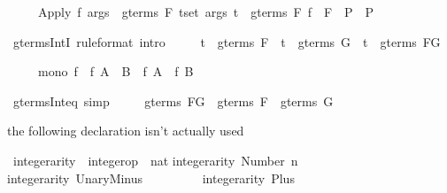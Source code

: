 \begin{isabellebody}
\begin{isamarkuptext}
\begin{isabelle}%
\ \ \ \ \ {\isasymlbrakk}Apply\ f\ args\ {\isasymin}\ gterms\ F{\isacharsemicolon}\ {\isasymlbrakk}{\isasymforall}t{\isasymin}set\ args{\isachardot}\ t\ {\isasymin}\ gterms\ F{\isacharsemicolon}\ f\ {\isasymin}\ F{\isasymrbrakk}\ {\isasymLongrightarrow}\ P{\isasymrbrakk}\ {\isasymLongrightarrow}\ P%
\end{isabelle}
%
\end{isamarkuptext}%
\isamarkuptrue%
\ gterms{\isacharunderscore}IntI\ {\isacharbrackleft}rule{\isacharunderscore}format{\isacharcomma}\ intro{\isacharbang}{\isacharbrackright}{\isacharcolon}\isanewline
\ \ \ \ \ {\isachardoublequote}t\ {\isasymin}\ gterms\ F\ {\isasymLongrightarrow}\ t\ {\isasymin}\ gterms\ G\ {\isasymlongrightarrow}\ t\ {\isasymin}\ gterms\ {\isacharparenleft}F{\isasyminter}G{\isacharparenright}{\isachardoublequote}\isanewline
\isamarkupfalse%
\isamarkupfalse%
\isamarkuptrue%
\isamarkupfalse%
\isamarkupfalse%
%
\begin{isamarkuptext}%
\begin{isabelle}%
\ \ \ \ \ mono\ f\ {\isasymLongrightarrow}\ f\ {\isacharparenleft}A\ {\isasyminter}\ B{\isacharparenright}\ {\isasymsubseteq}\ f\ A\ {\isasyminter}\ f\ B%
\end{isabelle}
%
\end{isamarkuptext}%
\isamarkuptrue%
\ gterms{\isacharunderscore}Int{\isacharunderscore}eq\ {\isacharbrackleft}simp{\isacharbrackright}{\isacharcolon}\isanewline
\ \ \ \ \ {\isachardoublequote}gterms\ {\isacharparenleft}F{\isasyminter}G{\isacharparenright}\ {\isacharequal}\ gterms\ F\ {\isasyminter}\ gterms\ G{\isachardoublequote}\isanewline
\isamarkupfalse%
\isamarkupfalse%
%
\begin{isamarkuptext}%
the following declaration isn't actually used%
\end{isamarkuptext}%
\isamarkuptrue%
\ integer{\isacharunderscore}arity\ {\isacharcolon}{\isacharcolon}\ {\isachardoublequote}integer{\isacharunderscore}op\ {\isasymRightarrow}\ nat{\isachardoublequote}\isanewline
\isamarkupfalse%
\isanewline
{\isachardoublequote}integer{\isacharunderscore}arity\ {\isacharparenleft}Number\ n{\isacharparenright}\ \ \ \ \ \ \ \ {\isacharequal}\ {}{\isachardoublequote}\isanewline
{\isachardoublequote}integer{\isacharunderscore}arity\ UnaryMinus\ \ \ \ \ \ \ \ {\isacharequal}\ {}{\isachardoublequote}\isanewline
{\isachardoublequote}integer{\isacharunderscore}arity\ Plus\ \ \ \ \ \ \ \ \ \ \ \ \ \ {\isacharequal}\ {}{\isachardoublequote}\isanewline

\end{isabellebody}
